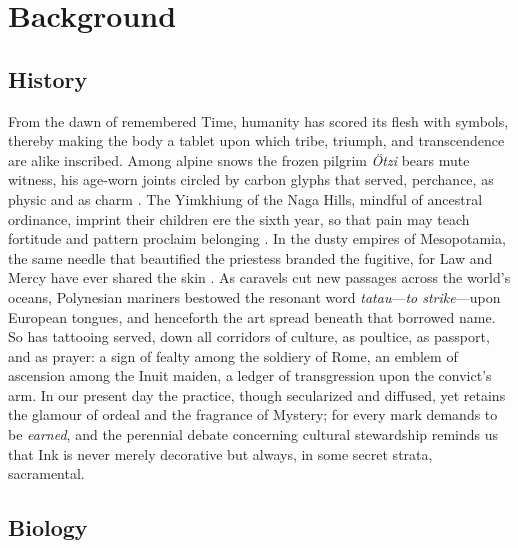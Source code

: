 \documentclass[11pt]{article}
\begin{document}
\section{Background}

\subsection{History}

From the dawn of remembered Time, humanity has scored its flesh with symbols, thereby making the body a tablet upon which tribe, triumph, and transcendence are alike inscribed.  
Among alpine snows the frozen pilgrim \textit{Ötzi} bears mute witness, his age‑worn joints circled by carbon glyphs that served, perchance, as physic and as charm \cite{deterwolf_worlds_oldest}.  
The Yimkhiung of the Naga Hills, mindful of ancestral ordinance, imprint their children ere the sixth year, so that pain may teach fortitude and pattern proclaim belonging \cite{kluger2015cultural}.  
In the dusty empires of Mesopotamia, the same needle that beautified the priestess branded the fugitive, for Law and Mercy have ever shared the skin \cite{hawken2022tattooing}.  
As caravels cut new passages across the world’s oceans, Polynesian mariners bestowed the resonant word \emph{tatau}—\emph{to strike}—upon European tongues, and henceforth the art spread beneath that borrowed name.  
So has tattooing served, down all corridors of culture, as poultice, as passport, and as prayer: a sign of fealty among the soldiery of Rome, an emblem of ascension among the Inuit maiden, a ledger of transgression upon the convict’s arm.  
In our present day the practice, though secularized and diffused, yet retains the glamour of ordeal and the fragrance of Mystery; for every mark demands to be \emph{earned}, and the perennial debate concerning cultural stewardship reminds us that Ink is never merely decorative but always, in some secret strata, sacramental.

\subsection{Biology}
\end{document}
